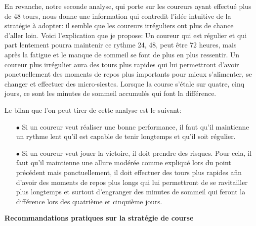 \documentclass[a4paper,12pt]{article}
\begin{document}
En revanche, notre seconde analyse, qui porte sur les coureurs ayant effectué plus de 48 tours, nous donne une information qui contredit l'idée intuitive de la stratégie à adopter: il semble que les coureurs irréguliers ont plus de chance d'aller loin. Voici l'explication que je propose: Un coureur qui est régulier et qui part lentement pourra maintenir ce rythme 24, 48, peut être 72 heures, mais après la fatigue et le manque de sommeil se font de plus en plus ressentir. Un coureur plus irrégulier aura des tours plus rapides qui lui permettront d'avoir ponctuellement des moments de repos plus importants pour mieux s'alimenter, se changer et effectuer des micro-siestes. Lorsque la course s'étale sur quatre, cinq jours, ce sont les minutes de sommeil accumulés qui font la différence.

\medskip

Le bilan que l'on peut tirer de cette analyse est le suivant:
\begin{itemize}
	\item[$\bullet$] Si un coureur veut réaliser une bonne performance, il faut qu'il maintienne un rythme lent qu'il est capable de tenir longtemps et qu'il soit régulier. 
	\item[$\bullet$] Si un coureur veut jouer la victoire, il doit prendre des risques. Pour cela, il faut qu'il maintienne une allure modérée comme expliqué lors du point précédent mais ponctuellement, il doit effectuer des tours plus rapides afin d'avoir des moments de repos plus longs qui lui permettront de se ravitailler plus longtemps et surtout d'engranger des minutes de sommeil qui feront la différence lors des quatrième et cinquième jours.
\end{itemize}

\begin{center}
	\textbf{Recommandations pratiques sur la stratégie de course}
\end{center}
\end{document}
